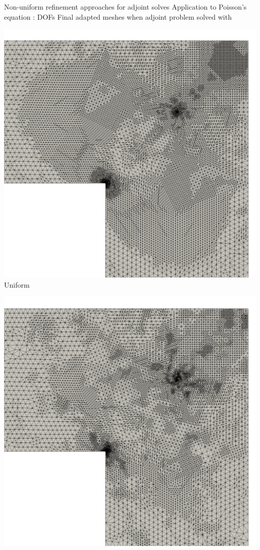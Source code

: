 \documentclass[fleqn]{beamer}
\begin{document}

\begin{frame}{Non-uniform refinement approaches for adjoint solves}
{Application to Poisson's equation : DOFs}
Final adapted meshes when adjoint problem solved with
\begin{minipage}{0.33\textwidth}
\centering
\includegraphics[width=0.99\textwidth]{../img/refine_squarehole_unif_close} \\
Uniform
\end{minipage}%
\begin{minipage}{0.33\textwidth}
\centering
\includegraphics[width=0.99\textwidth]{../img/refine_squarehole_long_close} \\

\end{minipage}
\end{frame}
\end{document}
